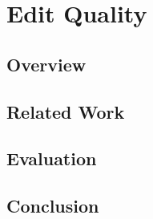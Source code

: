 \chapter{Edit Quality}
\label{ch:editquality}

    \section{Overview}
    \section{Related Work}
    \section{Evaluation}
    \section{Conclusion}


